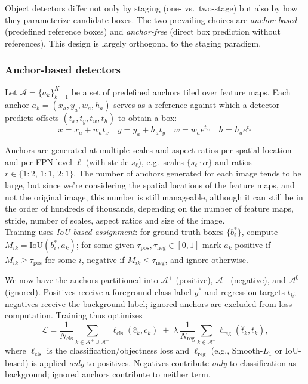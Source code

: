 Object detectors differ not only by staging (one- vs.\ two-stage) but also by how they parameterize candidate boxes. The two prevailing choices are \emph{anchor-based} (predefined reference boxes) and \emph{anchor-free} (direct box prediction without references). This design is largely orthogonal to the staging paradigm.

\subsubsection{Anchor-based detectors}
\label{sec:anchor_based_detectors}
Let $\mathcal{A}=\{a_k\}_{k=1}^{K}$ be a set of predefined anchors tiled over feature maps. 
Each anchor $a_k=(x_a,y_a,w_a,h_a)$ serves as a reference against which a detector predicts offsets $(t_x,t_y,t_w,t_h)$ to obtain a box:
$$
x = x_a + w_a t_x \quad
y = y_a + h_a t_y \quad
w = w_a e^{t_w} \quad
h = h_a e^{t_h}
$$

Anchors are generated at multiple scales and aspect ratios per spatial location and per FPN level $\ell$ (with stride $s_\ell$), e.g.\ scales $\{s_\ell \cdot \alpha\}$ and ratios $r \in \{1\!:\!2,\,1\!:\!1,\,2\!:\!1\}$.
The number of anchors generated for each image tends to be large, but since we're considering the spatial locations of the feature maps, and not the original image, this number is still manageable, although it can still be in the order of hundreds of thousands, depending on the number of feature maps, stride, number of scales, aspect ratios and size of the image.\\

Training uses \emph{IoU-based assignment}: for ground-truth boxes $\{b_i^\ast\}$, compute $M_{ik}=\mathrm{IoU}(b_i^\ast,a_k)$; for some given $\tau_{\text{pos}}, \tau_{\text{neg}} \in [0, 1]$ mark $a_k$ positive if $M_{ik}\ge \tau_{\text{pos}}$ for some $i$, negative if $M_{ik}\le \tau_{\text{neg}}$, and ignore otherwise. 

We now have the anchors partitioned into $\mathcal{A}^+$ (positive), $\mathcal{A}^-$ (negative), and $\mathcal{A}^0$ (ignored).
Positives receive a foreground class label $y^\ast$ and regression targets $t_k$; negatives receive the background label; ignored anchors are excluded from loss computation.
Training thus optimizes
$$
\mathcal{L}
= \frac{1}{N_{\text{cls}}}\sum_{k \in \mathcal{A}^+ \cup \mathcal{A}^-} \ell_{\text{cls}}(\hat{c}_k, c_k)
\;+\;
\lambda\,\frac{1}{N_{\text{reg}}}\sum_{k \in \mathcal{A}^+} \ell_{\text{reg}}(\hat{t}_k, t_k),
$$
where $\ell_{\text{cls}}$ is the classification/objectness loss and $\ell_{\text{reg}}$ (e.g., Smooth-$L_1$ or IoU-based) is applied \emph{only} to positives.
Negatives contribute \emph{only} to classification as background; ignored anchors contribute to neither term.

